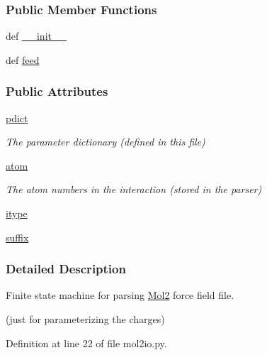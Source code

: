 \subsubsection*{Public Member Functions}
\begin{DoxyCompactItemize}
\item 
def \hyperlink{classforcebalance_1_1mol2io_1_1Mol2__Reader_ab3080c5acb0d45bdce7a37ae34e20d14}{\-\_\-\-\_\-init\-\_\-\-\_\-}
\item 
def \hyperlink{classforcebalance_1_1mol2io_1_1Mol2__Reader_a9433a00c23fa24b0c7ae134b9b194980}{feed}
\end{DoxyCompactItemize}
\subsubsection*{Public Attributes}
\begin{DoxyCompactItemize}
\item 
\hyperlink{classforcebalance_1_1mol2io_1_1Mol2__Reader_a3d0014f83cdf754983feade05fa162e2}{pdict}
\begin{DoxyCompactList}\small\item\em The parameter dictionary (defined in this file) \end{DoxyCompactList}\item 
\hyperlink{classforcebalance_1_1mol2io_1_1Mol2__Reader_ab65a3dde9c3f2ba716089a52de4bf9fe}{atom}
\begin{DoxyCompactList}\small\item\em The atom numbers in the interaction (stored in the parser) \end{DoxyCompactList}\item 
\hyperlink{classforcebalance_1_1mol2io_1_1Mol2__Reader_a86efd5020943bd5cb52a9299e88a4fac}{itype}
\item 
\hyperlink{classforcebalance_1_1mol2io_1_1Mol2__Reader_a3c5f0f93848a5d83a50facb1d01fe3b1}{suffix}
\end{DoxyCompactItemize}


\subsubsection{Detailed Description}
Finite state machine for parsing \hyperlink{namespaceforcebalance_1_1Mol2}{Mol2} force field file. 

(just for parameterizing the charges) 

Definition at line 22 of file mol2io.\-py.



